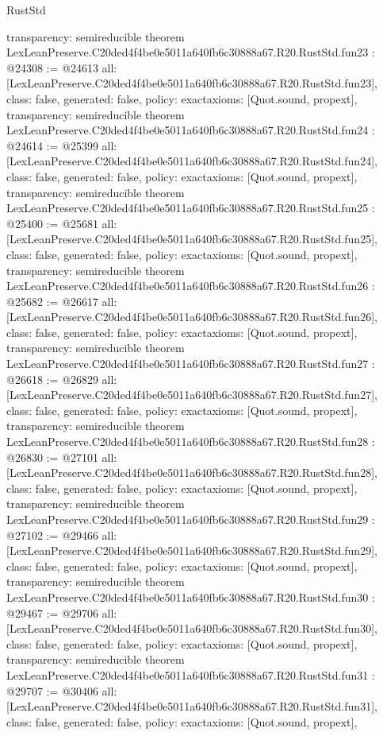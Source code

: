 \begin{lexlean}{RustStd}
\begin{coremodule}
{  transparency: semireducible
}
theorem LexLeanPreserve.C20ded4f4be0e5011a640fb6c30888a67.R20.RustStd.fun23 : @24308 := @24613 {
  all: [LexLeanPreserve.C20ded4f4be0e5011a640fb6c30888a67.R20.RustStd.fun23],
  class: false,
  generated: false,
  policy: exact{axioms: [Quot.sound, propext]},
  transparency: semireducible
}
theorem LexLeanPreserve.C20ded4f4be0e5011a640fb6c30888a67.R20.RustStd.fun24 : @24614 := @25399 {
  all: [LexLeanPreserve.C20ded4f4be0e5011a640fb6c30888a67.R20.RustStd.fun24],
  class: false,
  generated: false,
  policy: exact{axioms: [Quot.sound, propext]},
  transparency: semireducible
}
theorem LexLeanPreserve.C20ded4f4be0e5011a640fb6c30888a67.R20.RustStd.fun25 : @25400 := @25681 {
  all: [LexLeanPreserve.C20ded4f4be0e5011a640fb6c30888a67.R20.RustStd.fun25],
  class: false,
  generated: false,
  policy: exact{axioms: [Quot.sound, propext]},
  transparency: semireducible
}
theorem LexLeanPreserve.C20ded4f4be0e5011a640fb6c30888a67.R20.RustStd.fun26 : @25682 := @26617 {
  all: [LexLeanPreserve.C20ded4f4be0e5011a640fb6c30888a67.R20.RustStd.fun26],
  class: false,
  generated: false,
  policy: exact{axioms: [Quot.sound, propext]},
  transparency: semireducible
}
theorem LexLeanPreserve.C20ded4f4be0e5011a640fb6c30888a67.R20.RustStd.fun27 : @26618 := @26829 {
  all: [LexLeanPreserve.C20ded4f4be0e5011a640fb6c30888a67.R20.RustStd.fun27],
  class: false,
  generated: false,
  policy: exact{axioms: [Quot.sound, propext]},
  transparency: semireducible
}
theorem LexLeanPreserve.C20ded4f4be0e5011a640fb6c30888a67.R20.RustStd.fun28 : @26830 := @27101 {
  all: [LexLeanPreserve.C20ded4f4be0e5011a640fb6c30888a67.R20.RustStd.fun28],
  class: false,
  generated: false,
  policy: exact{axioms: [Quot.sound, propext]},
  transparency: semireducible
}
theorem LexLeanPreserve.C20ded4f4be0e5011a640fb6c30888a67.R20.RustStd.fun29 : @27102 := @29466 {
  all: [LexLeanPreserve.C20ded4f4be0e5011a640fb6c30888a67.R20.RustStd.fun29],
  class: false,
  generated: false,
  policy: exact{axioms: [Quot.sound, propext]},
  transparency: semireducible
}
theorem LexLeanPreserve.C20ded4f4be0e5011a640fb6c30888a67.R20.RustStd.fun30 : @29467 := @29706 {
  all: [LexLeanPreserve.C20ded4f4be0e5011a640fb6c30888a67.R20.RustStd.fun30],
  class: false,
  generated: false,
  policy: exact{axioms: [Quot.sound, propext]},
  transparency: semireducible
}
theorem LexLeanPreserve.C20ded4f4be0e5011a640fb6c30888a67.R20.RustStd.fun31 : @29707 := @30406 {
  all: [LexLeanPreserve.C20ded4f4be0e5011a640fb6c30888a67.R20.RustStd.fun31],
  class: false,
  generated: false,
  policy: exact{axioms: [Quot.sound, propext]},
}
\end{coremodule}
\end{lexlean}

